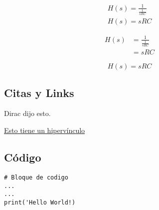 \begin{equation}
    \begin{gathered}
        H(s) = \frac{1}{\frac{1}{sRC}} \\
        H(s)= sRC
    \end{gathered}
\end{equation}

\begin{equation}
    \begin{split}
        H(s) &= \frac{1}{\frac{1}{sRC}} \\
             &= sRC
    \end{split}
\end{equation}



$$H(s)= sRC$$




\subsection{Citas y Links}

Dirac dijo esto. \cite{dirac}

\href{http://www.overleaf.com}{Esto tiene un hipervínculo}


\subsection{Código}
\begin{lstlisting}
# Bloque de codigo
...
...
print('Hello World!)
\end{lstlisting}



